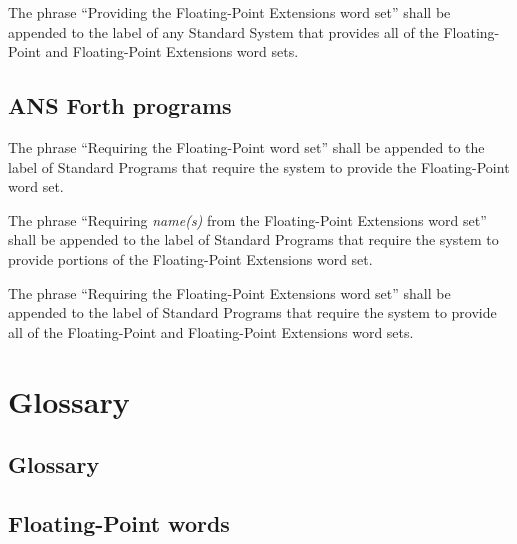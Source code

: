 The phrase ``Providing the Floating-Point Extensions word set'' shall
be appended to the label of any Standard System that provides all of
the Floating-Point and Floating-Point Extensions word sets.

\subsection{ANS Forth programs} %

The phrase ``Requiring the Floating-Point word set'' shall be
appended to the label of Standard Programs that require the system
to provide the Floating-Point word set.

The phrase ``Requiring \emph{name(s)} from the Floating-Point
Extensions word set'' shall be appended to the label of Standard
Programs that require the system to provide portions of the
Floating-Point Extensions word set.

The phrase ``Requiring the Floating-Point Extensions word set'' shall
be appended to the label of Standard Programs that require the system
to provide all of the Floating-Point and Floating-Point Extensions
word sets.


\section{Glossary} %

\begin{info}
\subsection{Glossary} %
\end{info}

\subsection{Floating-Point words} %


